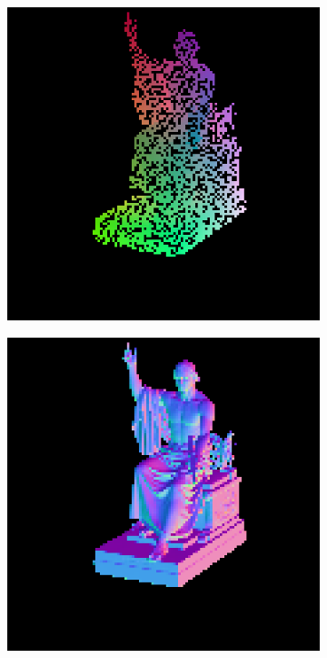 \begin{figure}
	
	\begin{subfigure}[b]{0.24\linewidth}
		\includegraphics[width=\linewidth]{./Figures/gcnn_synthetic/fancy_eval_3_point_cloud_noise.png}
	\end{subfigure}
	\begin{subfigure}[b]{0.24\linewidth}
		\includegraphics[width=\linewidth]{./Figures/gcnn_synthetic/fancy_eval_3_groundtruth.png}

\end{subfigure}
\end{figure}
